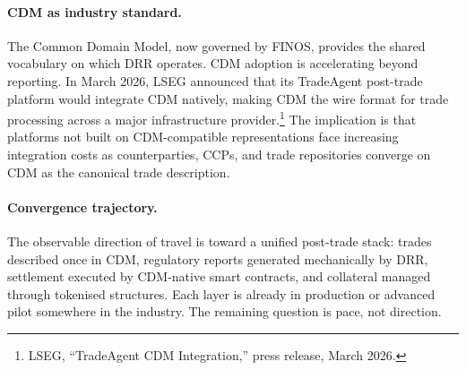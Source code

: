 \documentclass[11pt,a4paper]{article}
\begin{document}
\paragraph{CDM as industry standard.}
The Common Domain Model, now governed by FINOS, provides the shared vocabulary on which DRR operates. CDM adoption is accelerating beyond reporting. In March 2026, LSEG announced that its TradeAgent post-trade platform would integrate CDM natively, making CDM the wire format for trade processing across a major infrastructure provider.\footnote{LSEG, ``TradeAgent CDM Integration,'' press release, March 2026.} The implication is that platforms not built on CDM-compatible representations face increasing integration costs as counterparties, CCPs, and trade repositories converge on CDM as the canonical trade description.

\paragraph{Convergence trajectory.}
The observable direction of travel is toward a unified post-trade stack: trades described once in CDM, regulatory reports generated mechanically by DRR, settlement executed by CDM-native smart contracts, and collateral managed through tokenised structures. Each layer is already in production or advanced pilot somewhere in the industry. The remaining question is pace, not direction.
\end{document}
